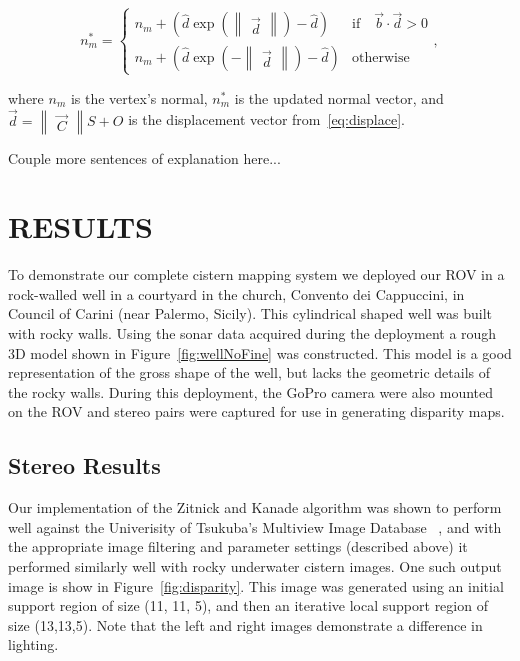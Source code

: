 \documentclass[a4paper,twoside]{article}
\begin{document}
\begin{equation}
n_m^* = \left \{ \begin{array}{ll}
        n_m + \left(\hat{d} \exp\left(\begin{Vmatrix}\vec{d}\end{Vmatrix}\right) - \hat{d}\right) & \text{if} \quad \vec{b} \cdot \vec{d} > 0 \\
        n_m + \left(\hat{d} \exp\left(-\begin{Vmatrix}\vec{d}\end{Vmatrix}\right) - \hat{d}\right) & \text{otherwise}
        \end{array},\right.
        \label{eq:lighting}
\end{equation}


where $n_m$ is the vertex's normal, $n_m^*$ is the updated normal vector, and $\vec{d} = \begin{Vmatrix}\vec{C}\end{Vmatrix} S + O$ is the displacement vector from~\eqref{eq:displace}.

Couple more sentences of explanation here...

\section{\uppercase{Results}}
\label{sec:results}

To demonstrate our complete cistern mapping system we deployed our ROV in a rock-walled well in a courtyard in the church, Convento dei Cappuccini, in Council of Carini (near Palermo, Sicily).
This cylindrical shaped well was built with rocky walls.  Using the sonar data acquired during the deployment a rough 3D model shown in Figure~\ref{fig:wellNoFine} was constructed.  This model is a good representation of the gross shape of the well, but lacks the geometric details of the rocky walls.  During this deployment, the GoPro camera were also mounted on the ROV and stereo pairs were captured for use in generating disparity maps.
 
\subsection{Stereo Results}

Our implementation of the Zitnick and Kanade algorithm was shown to perform well against the Univerisity of Tsukuba's Multiview Image Database ~\cite{stereo:zitKan}, and with the appropriate image filtering and parameter settings (described above) it performed similarly well with rocky underwater cistern images.  
One such output image is show in Figure~\ref{fig:disparity}.
This image was generated using an initial support region of size (11, 11, 5), and then an iterative local support region of size (13,13,5).
Note that the left and right images demonstrate a difference in lighting.
\end{document}

